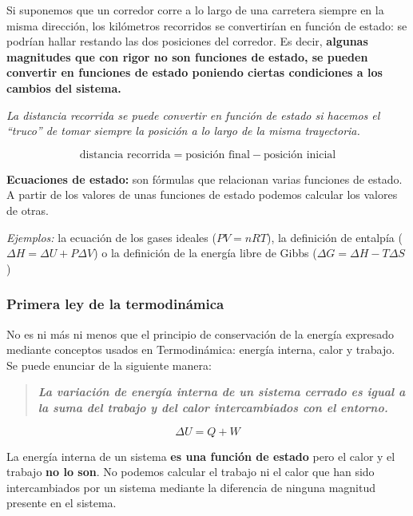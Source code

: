 \documentclass[
  spanish,
]{article}
\begin{document}
Si suponemos que un corredor corre a lo largo de una carretera siempre
en la misma dirección, los kilómetros recorridos se convertirían en
función de estado: se podrían hallar restando las dos posiciones del
corredor. Es decir, \textbf{algunas magnitudes que con rigor no son
funciones de estado, se pueden convertir en funciones de estado poniendo
ciertas condiciones a los cambios del sistema.}

\emph{La distancia recorrida se puede convertir en función de estado si
hacemos el ``truco'' de tomar siempre la posición a lo largo de la misma
trayectoria.}

\[\text{distancia recorrida} = \text{posición final} - \text{posición inicial}\]

\textbf{Ecuaciones de estado:} son fórmulas que relacionan varias
funciones de estado. A partir de los valores de unas funciones de estado
podemos calcular los valores de otras.

\emph{Ejemplos:} la ecuación de los gases ideales (\(PV = nRT\)), la
definición de entalpía (\(\Delta H = \Delta U + P\Delta V\)) o la
definición de la energía libre de Gibbs
(\(\Delta G = \Delta H - T\Delta S\))

\hypertarget{primera-ley-de-la-termodinuxe1mica}{%
\subsubsection{Primera ley de la
termodinámica}\label{primera-ley-de-la-termodinuxe1mica}}

No es ni más ni menos que el principio de conservación de la energía
expresado mediante conceptos usados en Termodinámica: energía interna,
calor y trabajo. Se puede enunciar de la siguiente manera:

\begin{quote}
\textbf{\emph{La variación de energía interna de un sistema cerrado es
igual a la suma del trabajo y del calor intercambiados con el entorno.}}
\end{quote}

\[\Delta U = Q + W\]

La energía interna de un sistema \textbf{es una función de estado} pero
el calor y el trabajo \textbf{no lo son}. No podemos calcular el trabajo
ni el calor que han sido intercambiados por un sistema mediante la
diferencia de ninguna magnitud presente en el sistema.
\end{document}
